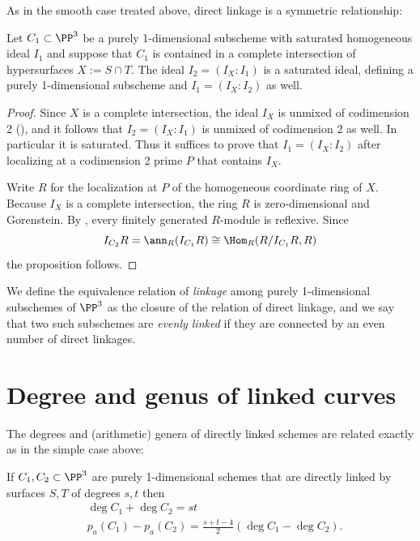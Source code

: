 As in the smooth case treated above, direct linkage is a symmetric relationship:
\begin{proposition}\label{link unmixed}
Let $C_1\subset \PP^3$ be a purely 1-dimensional subscheme with saturated homogeneous ideal $I_1$ and suppose that $C_1$ is contained in a complete intersection of
hypersurfaces $X := S\cap T$. The ideal $I_2 = (I_{X}:I_1)$ is a saturated ideal, defining a purely 1-dimensional subscheme and 
$I_1 = (I_{X}: I_2)$ as well.
\end{proposition}
 
\begin{proof}
Since $X$ is a complete intersection, the ideal $I_{X}$ is unmixed of codimension 2
(\cite[Proposition 18.13]{Eisenbud1995}), and it follows
that $I_2 = (I_{X}:I_1)$ is unmixed of codimension 2 as well. In particular it is saturated.
Thus it suffices to prove that $I_1 = (I_{X}: I_2)$ after localizing at a codimension 2 prime $P$
that contains $I_{X}$. 

Write $R$ for the localization at $P$ of the homogeneous coordinate ring of $X$. 
Because $I_{X}$ is a complete intersection, the ring $R$
 is zero-dimensional and Gorenstein.
By \cite[Propositions 21.1 and 21.5]{Eisenbud1995}, every finitely generated $R$-module is reflexive. Since 
$$
I_{C_2}R= \ann_{R}(I_{C_1}R) \cong \Hom_R(R/I_{C_1}R, R)
$$
the proposition follows.
\end{proof}

We define the equivalence relation of \emph{linkage} among purely 1-dimensional subschemes of $\PP^{3}$ as the
closure of the relation of direct linkage, and we say that two such subschemes are \emph{evenly linked}
if they are connected by an even number of direct linkages.

\section{Degree and genus of linked curves}
\label{duality} %

The degrees and (arithmetic) genera 
of directly linked schemes are related exactly as in the simple case above:

\begin{theorem}\label{direct linkage}\label{linked genus formula}
If $C_1,{C_2}\subset \PP^3$ are purely 1-dimensional schemes that are directly linked by surfaces $S,T$ of degrees $s,t$  then 
$$
\begin{aligned}
&\deg C_1+\deg C_2 = st\\
&p_a(C_1) - p_a({C_2}) = \frac{s+t-4}{2}(\deg C_1-\deg {C_2}).
\end{aligned}
 $$
\end{theorem}

